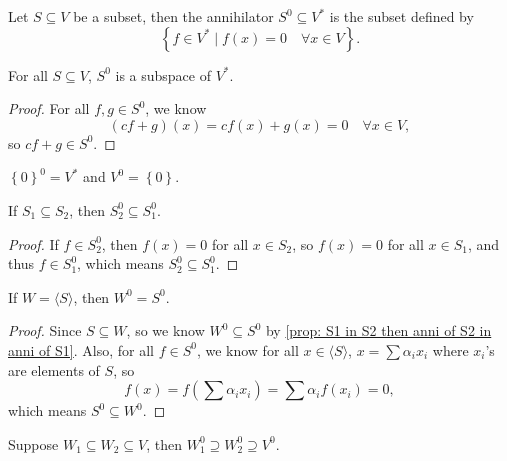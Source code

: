 \begin{definition}[Annihilator] \label{def: annihilator}
    Let \(S \subseteq V\) be a subset, then the annihilator \(S^0 \subseteq V^*\) is the subset defined by 
    \[
        \left\{ f \in V^* \mid f(x) = 0 \quad \forall x \in V\right\}. 
    \]  
\end{definition}

\begin{proposition}
    For all \(S \subseteq V\), \(S^0 \) is a subspace of \(V^*\).  
\end{proposition}
\begin{proof}
    For all \(f, g \in S^0\), we know 
    \[
        (cf + g)(x) = cf(x) + g(x) = 0 \quad \forall x \in V,
    \] so \(cf + g \in S^0\). 
\end{proof}

\begin{eg}
    \(\left\{ 0 \right\}^0 = V^* \) and \(V^0 = \left\{ 0 \right\} \).  
\end{eg}

\begin{proposition} \label{prop: S1 in S2 then anni of S2 in anni of S1}
    If \(S_1 \subseteq S_2\), then \(S_2^0 \subseteq S_1^0\).  
\end{proposition}
\begin{proof}
    If \(f \in S_2^0\), then \(f(x) = 0\) for all \(x \in S_2\), so \(f(x) = 0\) for all \(x \in S_1\), and thus \(f \in S_1^0\), which means \(S_2^0 \subseteq S_1^0\).       
\end{proof}

\begin{proposition}
    If \(W = \langle S \rangle \), then \(W^0 = S^0\).  
\end{proposition}
\begin{proof}
    Since \(S \subseteq W\), so we know \(W^0 \subseteq S^0\) by \autoref{prop: S1 in S2 then anni of S2 in anni of S1}. Also, for all \(f \in S^0\), we know for all \(x \in \langle S \rangle \), \(x = \sum \alpha _i x_i \) where \(x_i\)'s are elements of \(S\), so
    \[
        f(x) = f \left( \sum \alpha _i x_i  \right) = \sum \alpha _i f(x_i) = 0,  
    \] which means \(S^0 \subseteq W^0\).       
\end{proof}

\begin{eg}
    Suppose \(W_1 \subseteq W_2 \subseteq V\), then \(W_1^0 \supseteq W_2^0 \supseteq V^0\). 
\end{eg}

